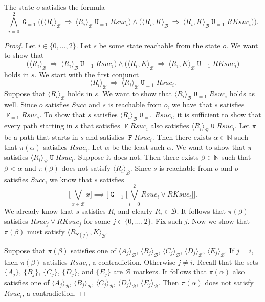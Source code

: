 \documentclass[a4paper,UKenglish,cleveref, autoref, thm-restate]{lipics-v2021}
\newcommand{\B}{\mathcal{B}}
\newcommand{\ex}[1]{\langle #1 \rangle}
\newcommand{\Succ}{\mathit{Succ}}
\newcommand{\RSuc}{\textit{Rsuc}}
\newcommand{\RKSuc}{\textit{RKsuc}}
\newcommand*{\opu}{\operatorname{\pmb{\mathtt{U}}}}
\newcommand*{\opf}{\operatorname{\pmb{\mathtt{F}}}}
\newcommand*{\opg}{\operatorname{\pmb{\mathtt{G}}}}
\newcommand*{\nat}{\mathbb{N}}
\begin{document}
\begin{proposition}
The state $o$ satisfies the formula
\[
       \bigwedge_{i=0}^2 \opg_{=1} \bigg(
       \big( \ex{R_i}_{\B} \ \Rightarrow \ \ex{R_i}_{\B} \opu_{=1} \RSuc_i \big) 
       \wedge
       \big( \ex{R_i,K}_{\B} \ \Rightarrow \ \ex{R_i,K}_{\B} \opu_{=1} \RKSuc_i \big) 
       \bigg).
\]
\end{proposition}

\begin{proof}
Let $i \in \{0, \ldots, 2 \}$.
Let $s$ be some state reachable from the state $o$.
We want to show that 
\[
\big( \ex{R_i}_{\B} \ \Rightarrow \ \ex{R_i}_{\B} \opu_{=1} \RSuc_i \big) 
\wedge
\big( \ex{R_i,K}_{\B} \ \Rightarrow \ \ex{R_i,K}_{\B} \opu_{=1} \RKSuc_i \big) 
\]
holds in $s$.
We start with the first conjunct
\[
\ex{R_i}_{\B} \ \Rightarrow \ \ex{R_i}_{\B} \opu_{=1} \RSuc_i.
\]
Suppose that $\ex{R_i}_{\B}$ holds in $s$.
We want to show that $\ex{R_i}_{\B} \opu_{=1} \RSuc_i$ holds as well.
Since $o$ satisfies $\overline{\Succ}$ and $s$ is reachable
from $o$, we have that $s$ satisfies $\opf_{=1} Rsuc_i$.
To show that $s$ satisfies $\ex{R_i}_{\B} \opu_{=1} \RSuc_i$,
it is sufficient to show that every path starting in $s$
that satisfies $\opf Rsuc_i$ also satisfies 
$\ex{R_i}_{\B} \opu \RSuc_i$.
Let $\pi$ be a path that starts in $s$ and satisfies $\opf Rsuc_i$.
Then there exists $\alpha \in \nat$ such that $\pi(\alpha)$
satisfies $Rsuc_i$.
Let $\alpha$ be the least such $\alpha$.
We want to show that $\pi$ satisfies $\ex{R_i}_{\B} \opu \RSuc_i$.
Suppose it does not.
Then there exists $\beta \in \nat$ such that $\beta < \alpha$
and $\pi(\beta)$ does not satisfy $\ex{R_i}_{\B}$.
Since $s$ is reachable from $o$ and $o$ satisfies $\overline{\Succ}$,
we know that $s$ satisfies
\[
    \bigg[
      \bigvee_{x \in \B} x
    \bigg]
    \implies
    \bigg[
      \opg_{=1} \big[ \bigvee_{i=0}^2 Rsuc_i \vee RKsuc_i \big]
    \bigg].
\]
We already know that $s$ satisfies $R_i$ and clearly $R_i \in \B$.
It follows that $\pi(\beta)$ satisfies $Rsuc_j \vee RKsuc_j$
for some $j \in \{0, \ldots, 2 \}$.
Fix such $j$.
Now we show that $\pi(\beta)$ must satisfy $\ex{R_{S(j)},K}_\B$.



Suppose that $\pi(\beta)$ satisfies one of $\ex{A_j}_{\B}$,
$\ex{B_j}_{\B}$, $\ex{C_j}_{\B}$, $\ex{D_j}_{\B}$,
$\ex{E_j}_{\B}$.
If $j=i$, then $\pi(\beta)$ satisfies $Rsuc_i$, a contradiction.
Otherwise $j \neq i$.
Recall that the sets $\{A_j\}$, $\{B_j\}$, $\{C_j\}$, $\{D_j\}$,
and $\{E_j\}$ are $\B$ markers.
It follows that $\pi(\alpha)$ also satisfies one of
$\ex{A_j}_{\B}$, $\ex{B_j}_{\B}$, $\ex{C_j}_{\B}$, $\ex{D_j}_{\B}$,
$\ex{E_j}_{\B}$.
Then $\pi(\alpha)$ does not satisfy $Rsuc_i$, a contradiction.



\end{proof}
\end{document}
